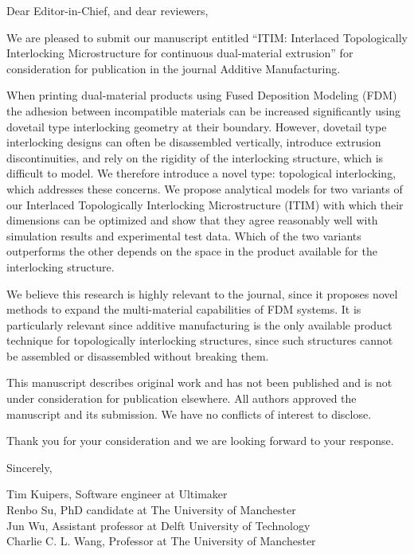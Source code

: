 \documentclass[a4paper,12pt]{letter}
\begin{document}
\begin{letter}{}


\vspace*{-5\baselineskip}%

\opening{
\vspace*{-1\baselineskip}%
Dear Editor-in-Chief, and dear reviewers,
}


We are pleased to submit our manuscript entitled ``ITIM: Interlaced Topologically Interlocking Microstructure for continuous dual-material extrusion''
for consideration for publication in the journal Additive Manufacturing.

When printing dual-material products using Fused Deposition Modeling (FDM) the adhesion between incompatible materials can be increased significantly using dovetail type interlocking geometry at their boundary.
However, dovetail type interlocking designs can often be disassembled vertically, introduce extrusion discontinuities, and rely on the rigidity of the interlocking structure, which is difficult to model.
We therefore introduce a novel type: topological interlocking, which addresses these concerns.
We propose analytical models for two variants of our Interlaced Topologically Interlocking Microstructure (ITIM) with which their dimensions can be optimized
and show that they agree reasonably well with simulation results and experimental test data.
Which of the two variants outperforms the other depends on the space in the product available for the interlocking structure.

We believe this research is highly relevant to the journal, since it proposes novel methods to expand the multi-material capabilities of FDM systems.
It is particularly relevant since additive manufacturing is the only available product technique for topologically interlocking structures,
since such structures cannot be assembled or disassembled without breaking them.

This manuscript describes original work and has not been published and is not under consideration for publication elsewhere. 
All authors approved the manuscript and its submission. We have no conflicts of interest to disclose.

Thank you for your consideration and we are looking forward to your response.

\bigskip 

Sincerely,

\bigskip 
Tim Kuipers, Software engineer at Ultimaker \\
Renbo Su, PhD candidate at The University of Manchester\\
Jun Wu, Assistant professor at Delft University of Technology \\
Charlie C. L. Wang, Professor at The University of Manchester



\end{letter}
\end{document}
